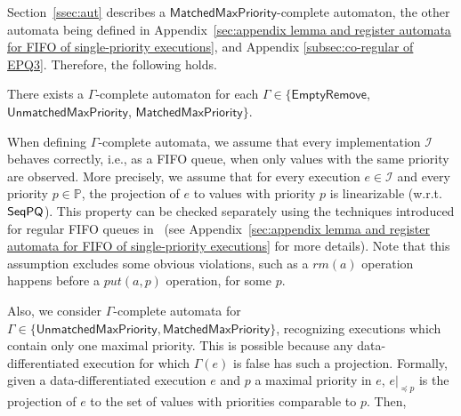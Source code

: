 Section~\ref{ssec:aut} describes a $\mathsf{MatchedMaxPriority}$-complete automaton, the other automata being defined in Appendix~\ref{sec:appendix lemma and register automata for FIFO of single-priority executions}, %
and Appendix \ref{subsec:co-regular of EPQ3}. Therefore, the following holds.

\begin{lemma}
There exists a $\Gamma$-complete automaton for each $\Gamma\in \{\mathsf{EmptyRemove}$, $\mathsf{UnmatchedMaxPriority}$, $\mathsf{MatchedMaxPriority}\}$.
\end{lemma}

When defining $\Gamma$-complete automata, we assume that every implementation $\mathcal{I}$ behaves correctly, i.e., as a FIFO queue, when only values with the same priority are observed. More precisely, we assume that for every execution $e\in\mathcal{I}$ and every priority $p\in\mathbb{P}$, the projection of $e$ to values with priority $p$ is linearizable (w.r.t. $\mathsf{SeqPQ}$). This property can be checked separately using the techniques introduced for regular FIFO queues in~\cite{DBLP:conf/icalp/BouajjaniEEH15} (see Appendix~\ref{sec:appendix lemma and register automata for FIFO of single-priority executions} for more details). Note that this assumption excludes some obvious violations, such as a $\textit{rm}(a)$ operation happens before a $\textit{put}(a,p)$ operation, for some $p$.

Also, we consider $\Gamma$-complete automata for $\Gamma\in \{\mathsf{UnmatchedMaxPriority}, \mathsf{MatchedMaxPriority}\}$, recognizing executions which contain only one maximal priority. This is possible because any data-differentiated execution for which $\Gamma(e)$ is false has such a projection.
Formally, given a data-differentiated execution $e$ and $p$ a maximal priority in $e$, $e\vert_{\preceq p}$ is the projection of $e$ to the set of values with priorities comparable to $p$. Then,

